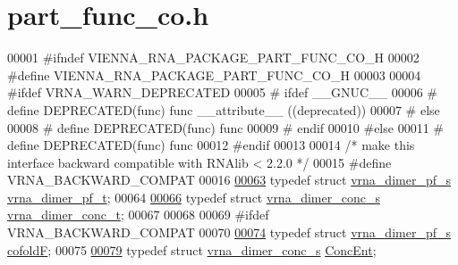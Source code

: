 \hypertarget{part__func__co_8h_source}{}\section{part\+\_\+func\+\_\+co.\+h}
\label{part__func__co_8h_source}

\begin{DoxyCode}
00001 \textcolor{preprocessor}{#ifndef VIENNA\_RNA\_PACKAGE\_PART\_FUNC\_CO\_H}
00002 \textcolor{preprocessor}{#define VIENNA\_RNA\_PACKAGE\_PART\_FUNC\_CO\_H}
00003 
00004 \textcolor{preprocessor}{#ifdef VRNA\_WARN\_DEPRECATED}
00005 \textcolor{preprocessor}{# ifdef \_\_GNUC\_\_}
00006 \textcolor{preprocessor}{#  define DEPRECATED(func) func \_\_attribute\_\_ ((deprecated))}
00007 \textcolor{preprocessor}{# else}
00008 \textcolor{preprocessor}{#  define DEPRECATED(func) func}
00009 \textcolor{preprocessor}{# endif}
00010 \textcolor{preprocessor}{#else}
00011 \textcolor{preprocessor}{# define DEPRECATED(func) func}
00012 \textcolor{preprocessor}{#endif}
00013 
00014 \textcolor{comment}{/* make this interface backward compatible with RNAlib < 2.2.0 */}
00015 \textcolor{preprocessor}{#define VRNA\_BACKWARD\_COMPAT}
00016 
\hyperlink{group__pf__cofold_ga444df1587c9a2ca15b8eb25188f629c3}{00063} \textcolor{keyword}{typedef} \textcolor{keyword}{struct }\hyperlink{group__pf__cofold_structvrna__dimer__pf__s}{vrna\_dimer\_pf\_s}  \hyperlink{group__pf__cofold_structvrna__dimer__pf__s}{vrna\_dimer\_pf\_t};
00064 
\hyperlink{group__pf__cofold_gac48c2723444ecfdceafcfd525ca98322}{00066} \textcolor{keyword}{typedef} \textcolor{keyword}{struct }\hyperlink{group__pf__cofold_structvrna__dimer__conc__s}{vrna\_dimer\_conc\_s}  \hyperlink{group__pf__cofold_structvrna__dimer__conc__s}{vrna\_dimer\_conc\_t};
00067 
00068 
00069 \textcolor{preprocessor}{#ifdef VRNA\_BACKWARD\_COMPAT}
00070 
\hyperlink{group__pf__cofold_ga5445d8d96a40e9e79b1fa5a7f1a6b7ea}{00074} \textcolor{keyword}{typedef} \textcolor{keyword}{struct }\hyperlink{group__pf__cofold_structvrna__dimer__pf__s}{vrna\_dimer\_pf\_s}    \hyperlink{group__pf__cofold_structvrna__dimer__pf__s}{cofoldF};
00075 
\hyperlink{group__pf__cofold_ga46244c7adf5040580291c45b465f4efa}{00079} \textcolor{keyword}{typedef} \textcolor{keyword}{struct }\hyperlink{group__pf__cofold_structvrna__dimer__conc__s}{vrna\_dimer\_conc\_s}  \hyperlink{group__pf__cofold_structvrna__dimer__conc__s}{ConcEnt};

\end{DoxyCode}

